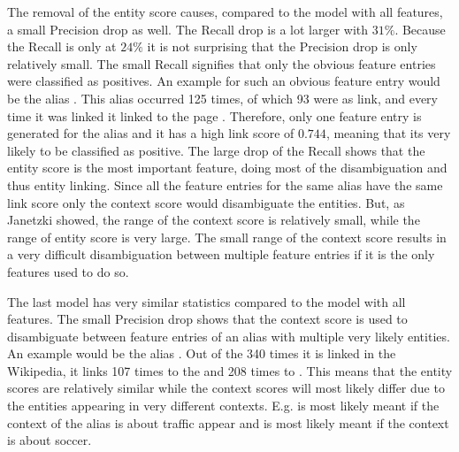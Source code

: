 The removal of the entity score causes, compared to the model with all features, a small Precision drop as well. The Recall drop is a lot larger with $31\%$. Because the Recall is only at $24\%$ it is not surprising that the Precision drop is only relatively small. The small Recall signifies that only the obvious feature entries were classified as positives. An example for such an obvious feature entry would be the alias . This alias occurred 125 times, of which 93 were as link, and every time it was linked it linked to the page . Therefore, only one feature entry is generated for the alias and it has a high link score of $0.744$, meaning that its very likely to be classified as positive. The large drop of the Recall shows that the entity score is the most important feature, doing most of the disambiguation and thus entity linking. Since all the feature entries for the same alias have the same link score only the context score would disambiguate the entities. But, as Janetzki \cite{janetzki} showed, the range of the context score is relatively small, while the range of entity score is very large. The small range of the context score results in a very difficult disambiguation between multiple feature entries if it is the only features used to do so.\par
The last model has very similar statistics compared to the model with all features. The small Precision drop shows that the context score is used to disambiguate between feature entries of an alias with multiple very likely entities. An example would be the alias . Out of the 340 times it is linked in the Wikipedia, it links 107 times to the  and 208 times to . This means that the entity scores are relatively similar while the context scores will most likely differ due to the entities appearing in very different contexts. E.g.  is most likely meant if the context of the alias is about traffic appear and  is most likely meant if the context is about soccer.\par
